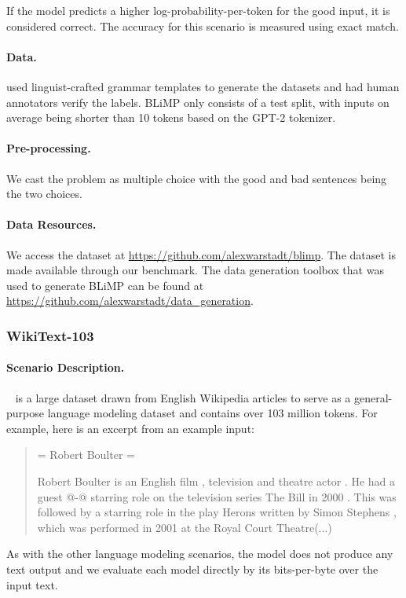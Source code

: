 If the model predicts a higher log-probability-per-token for the good input, it is considered correct. The accuracy for this scenario is measured using exact match.

\paragraph{Data.}
\citet{warstadt-etal-2020-blimp-benchmark} used linguist-crafted grammar templates to generate the datasets and had human annotators verify the labels.
BLiMP only consists of a test split, with inputs on average being shorter than 10 tokens based on the GPT-2 tokenizer.

\paragraph{Pre-processing.} We cast the problem as multiple choice with the good and bad sentences being the two choices.

\paragraph{Data Resources.}
We access the dataset at \url{https://github.com/alexwarstadt/blimp}.
The dataset is made available through our benchmark. 
The data generation toolbox that was used to generate BLiMP can be found at \url{https://github.com/alexwarstadt/data_generation}.


\subsubsection{WikiText-103}
\paragraph{Scenario Description.} \wikitext~\citep{merity2016pointer} is a large dataset drawn from English Wikipedia articles to serve as a general-purpose language modeling dataset and contains over 103 million tokens. For example, here is an excerpt from an example input:
\begin{quote}
    = Robert Boulter =
    
    
    Robert Boulter is an English film , television and theatre actor . He had a guest @-@ starring role on the television series The Bill in 2000 . This was followed by a starring role in the play Herons written by Simon Stephens , which was performed in 2001 at the Royal Court Theatre(...)
\end{quote}
As with the other language modeling scenarios, the model does not produce any text output and we evaluate each model directly by its bits-per-byte over the input text.

